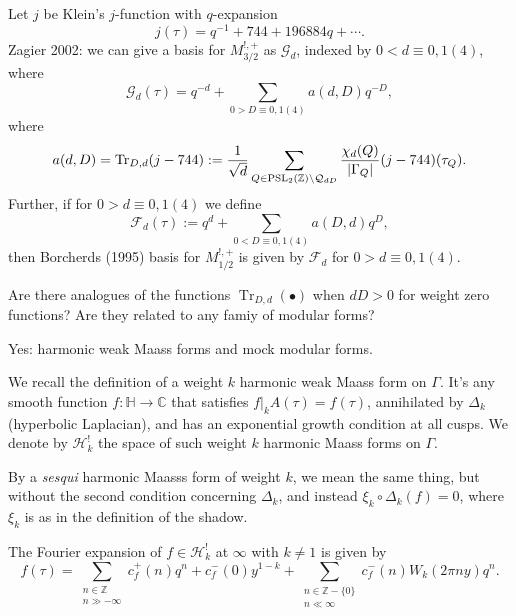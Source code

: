 \documentclass[reqno]{amsart} 
\begin{document}
Let $j$ be Klein's $j$-function with $q$-expansion
\begin{equation*}
  j(\tau) = q^{-1} + 744 + 196884q + \dotsb.
\end{equation*}
Zagier 2002: we can give a basis for $M_{3/2}^{!, +}$ as $\mathcal{G}_d$, indexed by $0 < d \equiv 0, 1(4)$, where
\begin{equation*}
  \mathcal{G}_d(\tau) = q^{- d} + \sum_{0 > D \equiv 0, 1 (4)} a(d, D) q^{- D},
\end{equation*}
where
\begin{equation*}
  a(d, D) = \operatorname{Tr}_{D, d}(j - 744)
  := \frac{1}{\sqrt{d}}
  \sum_{Q \in \operatorname{PSL}_2(\mathbb{Z}) \backslash \mathcal{Q}_{d D}}
  \frac{\chi_d(Q)}{ \lvert \Gamma_Q \rvert}(j - 744)(\tau_Q).
\end{equation*}
Further, if for $0 > d \equiv 0, 1(4)$ we define
\begin{equation*}
  \mathcal{F}_d(\tau) := q^d + \sum_{0 < D \equiv 0 , 1(4)} a(D, d) q^D,
\end{equation*}
then Borcherds (1995) basis for $M_{1/2}^{!, +}$ is given by $\mathcal{F}_d$ for $0 > d \equiv 0,1(4)$.

\begin{question}
  Are there analogues of the functions $\operatorname{Tr}_{D, d}(\bullet)$ when $d D > 0$ for weight zero functions?  Are they related to any famiy of modular forms?
\end{question}
\begin{answer}
  Yes:  harmonic weak Maass forms and mock modular forms.
\end{answer}

We recall the definition of a weight $k$ harmonic weak Maass form on $\Gamma$.  It's any smooth function $f : \mathbb{H} \rightarrow \mathbb{C}$ that satisfies $f |_k A(\tau) = f(\tau)$, annihilated by $\Delta_k$ (hyperbolic Laplacian), and has an exponential growth condition at all cusps.  We denote by $\mathcal{H}_k ^!$ the space of such weight $k$ harmonic Maass forms on $\Gamma$.

By a \emph{sesqui} harmonic Maasss form of weight $k$, we mean the same thing, but without the second condition concerning $\Delta_k$, and instead $\xi_k \circ \Delta_k(f) = 0$, where $\xi_k$ is as in the definition of the shadow.

The Fourier expansion of $f \in \mathcal{H}_k ^!$ at $\infty$ with $k \neq 1$ is given by
\begin{equation*}
  f(\tau) = \sum_{
    \substack{
      n \in \mathbb{Z}  \\
      n \gg - \infty      
    }
  } c_f^+(n) q^n + c_f^-(0) y^{1 - k}
  + \sum_{
    \substack{
      n \in \mathbb{Z} - \{0\}  \\
      n \ll \infty      
    }
  } c_f^-(n)
  W_k(2 \pi n y) q^n.
\end{equation*}
\end{document}
